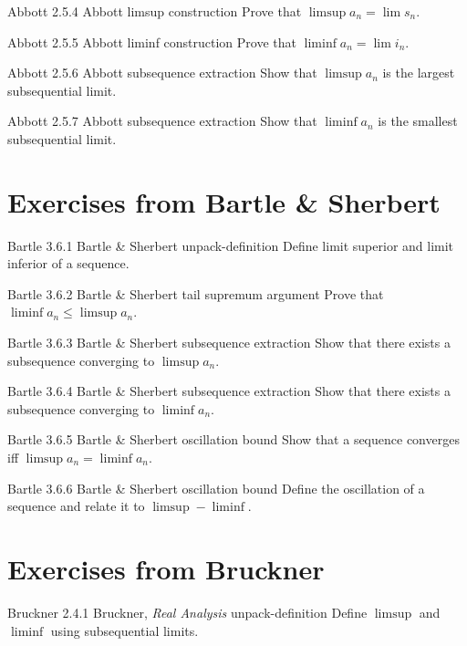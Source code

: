 \exstub
{Abbott 2.5.4}
{Abbott}
{limsup construction}
{Prove that $\limsup a_n = \lim s_n$.}

\exstub
{Abbott 2.5.5}
{Abbott}
{liminf construction}
{Prove that $\liminf a_n = \lim i_n$.}

\exstub
{Abbott 2.5.6}
{Abbott}
{subsequence extraction}
{Show that $\limsup a_n$ is the largest subsequential limit.}

\exstub
{Abbott 2.5.7}
{Abbott}
{subsequence extraction}
{Show that $\liminf a_n$ is the smallest subsequential limit.}


\section*{Exercises from Bartle \& Sherbert}

\exstub
{Bartle 3.6.1}
{Bartle \& Sherbert}
{unpack-definition}
{Define limit superior and limit inferior of a sequence.}

\exstub
{Bartle 3.6.2}
{Bartle \& Sherbert}
{tail supremum argument}
{Prove that $\liminf a_n \le \limsup a_n$.}

\exstub
{Bartle 3.6.3}
{Bartle \& Sherbert}
{subsequence extraction}
{Show that there exists a subsequence converging to $\limsup a_n$.}

\exstub
{Bartle 3.6.4}
{Bartle \& Sherbert}
{subsequence extraction}
{Show that there exists a subsequence converging to $\liminf a_n$.}

\exstub
{Bartle 3.6.5}
{Bartle \& Sherbert}
{oscillation bound}
{Show that a sequence converges iff $\limsup a_n = \liminf a_n$.}

\exstub
{Bartle 3.6.6}
{Bartle \& Sherbert}
{oscillation bound}
{Define the oscillation of a sequence and relate it to
$\limsup - \liminf$.}


\section*{Exercises from Bruckner}

\exstub
{Bruckner 2.4.1}
{Bruckner, \textit{Real Analysis}}
{unpack-definition}
{Define $\limsup$ and $\liminf$ using subsequential limits.}


